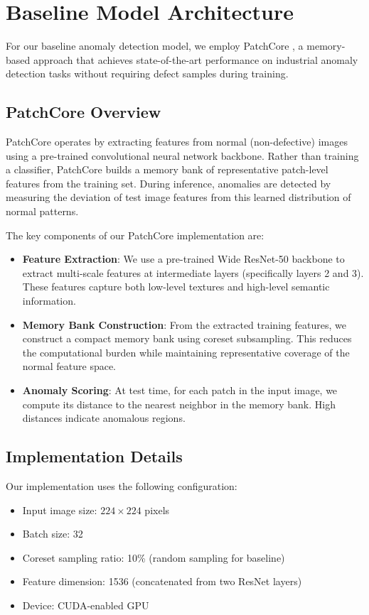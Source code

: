 \documentclass{article}
\begin{document}
\section{Baseline Model Architecture}

For our baseline anomaly detection model, we employ PatchCore \citep{Roth2022TotalRecall}, a memory-based approach that achieves state-of-the-art performance on industrial anomaly detection tasks without requiring defect samples during training.

\subsection{PatchCore Overview}

PatchCore operates by extracting features from normal (non-defective) images using a pre-trained convolutional neural network backbone. Rather than training a classifier, PatchCore builds a memory bank of representative patch-level features from the training set. During inference, anomalies are detected by measuring the deviation of test image features from this learned distribution of normal patterns.

The key components of our PatchCore implementation are:

\begin{itemize}
    \item \textbf{Feature Extraction}: We use a pre-trained Wide ResNet-50 backbone to extract multi-scale features at intermediate layers (specifically layers 2 and 3). These features capture both low-level textures and high-level semantic information.

    \item \textbf{Memory Bank Construction}: From the extracted training features, we construct a compact memory bank using coreset subsampling. This reduces the computational burden while maintaining representative coverage of the normal feature space.

    \item \textbf{Anomaly Scoring}: At test time, for each patch in the input image, we compute its distance to the nearest neighbor in the memory bank. High distances indicate anomalous regions.
\end{itemize}

\subsection{Implementation Details}

Our implementation uses the following configuration:
\begin{itemize}
    \item Input image size: $224 \times 224$ pixels
    \item Batch size: 32
    \item Coreset sampling ratio: 10\% (random sampling for baseline)
    \item Feature dimension: 1536 (concatenated from two ResNet layers)
    \item Device: CUDA-enabled GPU
\end{itemize}
\end{document}
